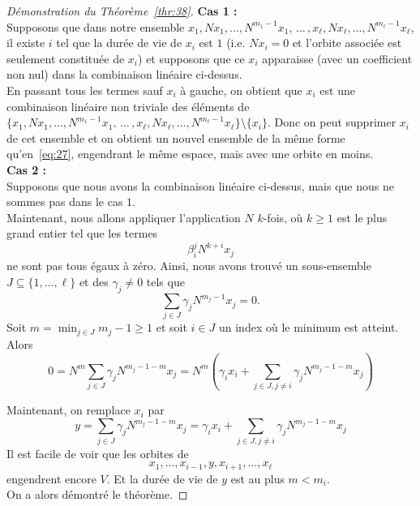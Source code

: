 \begin{proof}[Démonstration du Théorème~\ref{thr:38}]
\textbf{Cas 1 :} \\
Supposons que dans notre ensemble $x_1,Nx_1,\dots,N^{m_1-1}x_1, \,\dots \, ,  x_\ell,Nx_\ell,\dots,N^{m_\ell-1}x_\ell$, il existe $i$ tel que la durée de vie de $x_i$ est $1$ (i.e. $Nx_i = 0$ et l'orbite associée est seulement constituée de $x_i$) et supposons que ce $x_i$ apparaisse (avec un coefficient non nul) dans la combinaison linéaire ci-dessus. \\
En passant tous les termes sauf $x_i$ à gauche, on obtient  que $x_i$ est une combinaison linéaire non triviale des éléments de $\{ x_1,Nx_1,\dots,N^{m_1-1}x_1, \,\dots \, ,  x_\ell,Nx_\ell,\dots,N^{m_\ell-1}x_\ell \} \setminus \{x_i\}$. Donc on peut supprimer $x_i$ de cet ensemble et on obtient un nouvel ensemble de la même forme qu'en~\eqref{eq:27}, engendrant le même espace, mais avec une orbite en moins. \\

\textbf{Cas 2 :} \\
Supposons que nous avons la combinaison linéaire ci-dessus, mais que nous ne sommes pas dans le cas $1$. \\
Maintenant, nous allons appliquer l'application $N$ $k$-fois, où $k \geq 1$ est le plus grand entier tel que les termes 
\begin{displaymath}
  β_i^j N^{k+i}x_j 
\end{displaymath}
ne sont pas tous égaux à zéro. Ainsi, nous avons trouvé un sous-ensemble $J ⊆ \{1,\dots,\ell \}$ et des $γ_j ≠ 0$ tels que 
\begin{displaymath}
  \sum_{j \in J} γ_j N^{m_j-1}x_j = 0.
\end{displaymath}
Soit $m = \min_{j \in J} {m_j-1} \geq 1$ et soit $i \in J$ un index où le minimum est atteint. Alors 
\begin{displaymath}
 0 =  N^m  \sum_{j \in J} γ_j N^{m_j-1 - m}x_j  = N^m \left( γ_i x_i + \sum_{j \in J, j \neq i} γ_j N^{m_j-1 - m}x_j \right)
\end{displaymath}

Maintenant, on remplace $x_i$ par $$y = \sum_{j \in J} γ_j N^{m_j-1 - m}x_j = γ_i x_i + \sum_{j \in J, j \neq i} γ_j N^{m_j-1 - m}x_j$$ 
Il est facile de voir que les orbites de 
\begin{displaymath}
  x_1,\dots, x_{i-1},y,x_{i+1},\dots,x_\ell
\end{displaymath}
engendrent encore $V$. Et la durée de vie de $y$ est au plus $m<m_i$. \\
On a alors démontré le théorème.  
\end{proof}



